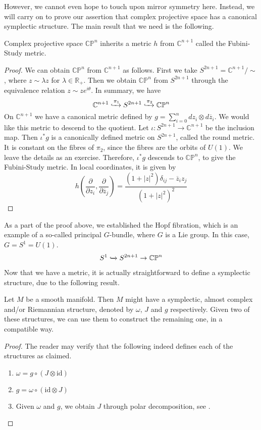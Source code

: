 However, we cannot even hope to touch upon mirror symmetry here. Instead, we will carry on to prove our assertion that complex projective space has a canonical symplectic structure. The main result that we need is the following.
\begin{theorem}
  Complex projective space $\mathbb{CP}^n$ inherits a metric $h$ from $\mathbb{C}^{n+1}$ called the Fubini-Study metric.
\end{theorem}
\begin{proof}
  We can obtain $\mathbb{CP}^n$ from $\mathbb{C}^{n+1}$ as follows. First we take $S^{2n+1}=\mathbb{C}^{n+1}/\sim$, where $z\sim\lambda z$ for $\lambda\in\mathbb{R}_+$. Then we obtain $\mathbb{CP}^n$ from $S^{2n+1}$ through the equivalence relation $z\sim ze^{i\theta}$. In summary, we have
  $$\mathbb{C}^{n+1}\xhookrightarrow{\pi_1} S^{2n+1}\xhookrightarrow{\pi_2}\mathbb{CP}^n$$
  On $\mathbb{C}^{n+1}$ we have a canonical metric defined by $g=\sum_{i=0}^{n}dz_i\otimes d\overline{z}_i$. We would like this metric to descend to the quotient. Let $\iota:S^{2n+1}\to\mathbb{C}^{n+1}$ be the inclusion map. Then $\iota^*g$ is a canonically defined metric on $S^{2n+1}$, called the round metric. It is constant on the fibres of $\pi_2$, since the fibres are the orbits of $U(1)$. We leave the details as an exercise. Therefore, $\iota^*g$ descends to $\mathbb{CP}^n$, to give the Fubini-Study metric. In local coordinates, it is given by
  $$h(\frac{\partial}{\partial z_i},\frac{\partial}{\partial\overline{z}_j})=\frac{(1+|z|^2)\delta_{ij}-\overline{z}_iz_j}{(1+|z|^2)^2}$$
\end{proof}
\begin{remark}
  As a part of the proof above, we established the Hopf fibration, which is an example of a so-called principal $G$-bundle, where $G$ is a Lie group. In this case, $G=S^1=U(1)$.
  $$S^1\xhookrightarrow{}S^{2n+1}\to\mathbb{CP}^n$$
\end{remark}
Now that we have a metric, it is actually straightforward to define a symplectic structure, due to the following result.
\begin{theorem}
  Let $M$ be a smooth manifold. Then $M$ might have a symplectic, almost complex and/or Riemannian structure, denoted by $\omega$, $J$ and $g$ respectively. Given two of these structures, we can use them to construct the remaining one, in a compatible way.
\end{theorem}
\begin{proof}
  The reader may verify that the following indeed defines each of the structures as claimed.
  \begin{enumerate} 
    \item $\omega=g\circ (J\otimes\text{id})$
    \item $g=\omega\circ(\text{id}\otimes J)$
    \item Given $\omega$ and $g$, we obtain $J$ through polar decomposition, see \cite{book:cds}.
  \end{enumerate}
\end{proof}
